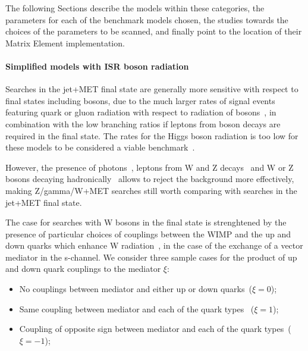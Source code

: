 The following Sections describe the models within these categories, 
the parameters for each of the benchmark models chosen,
the studies towards the choices of the parameters to be scanned, 
and finally point to the location of their Matrix Element 
implementation. 

\paragraph{Simplified models with ISR boson radiation}

Searches in the jet+MET final state are generally more sensitive
with respect to final states including bosons, due to the much 
larger rates of signal events featuring quark or gluon radiation with 
respect to radiation of bosons~\citep{Zhou:2013fla}, 
in combination with the low branching ratios if leptons from 
boson decays are required in the final state. 
The rates for the Higgs boson radiation is too low for these models 
to be considered a viable benchmark~\citep{Carpenter:2013xra}.

However, the presence of photons~\citep{Khachatryan:2014rwa, Aad:2014vka}, 
leptons from W and Z decays~\citep{Khachatryan:2014tva, Aad:2014vka, ATLAS:2014wra} 
and W or Z bosons decaying hadronically~\citep{Aad:2013oja}
allows to reject the background more effectively, making Z/gamma/W+MET searches 
still worth comparing with searches in the jet+MET final state. 


The case for searches with W bosons in the final state is strenghtened by the 
presence of particular choices of couplings between the WIMP and the up and 
down quarks which enhance W radiation~\citep{Bai:2012xg}, in the case of the exchange
of a vector mediator in the s-channel. 
We consider three sample cases for the product of 
up and down quark couplings to the mediator $\xi$:
\begin{itemize}
 \item No couplings between mediator and either up or down quarks~($\xi=0$);
 \item Same coupling between mediator and each of the quark types~ ($\xi=1$);
 \item Coupling of opposite sign between mediator and each of the quark types~($\xi=-1$);
\end{itemize}

